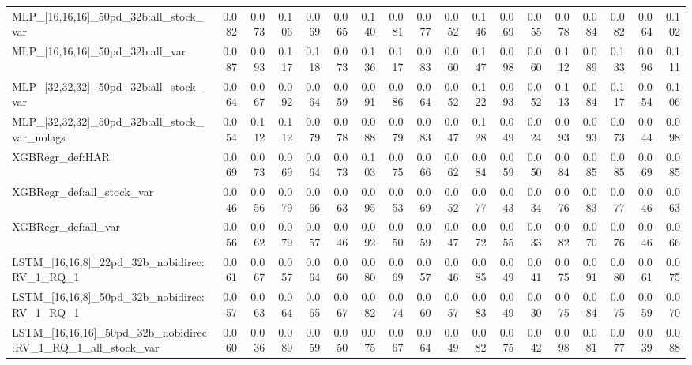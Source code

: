 \begin{tabular}{lrrrrrrrrrrrrrrrrr}
MLP\_[16,16,16]\_50pd\_32b:all\_stock\_var & 0.082 & 0.073 & 0.106 & 0.069 & 0.065 & 0.140 & 0.081 & 0.077 & 0.052 & 0.146 & 0.069 & 0.055 & 0.078 & 0.084 & 0.082 & 0.064 & 0.102 \\
MLP\_[16,16,16]\_50pd\_32b:all\_var & 0.087 & 0.093 & 0.117 & 0.118 & 0.073 & 0.136 & 0.117 & 0.083 & 0.060 & 0.147 & 0.098 & 0.060 & 0.112 & 0.089 & 0.133 & 0.096 & 0.111 \\
MLP\_[32,32,32]\_50pd\_32b:all\_stock\_var & 0.064 & 0.067 & 0.092 & 0.064 & 0.059 & 0.091 & 0.086 & 0.064 & 0.052 & 0.122 & 0.093 & 0.052 & 0.113 & 0.084 & 0.117 & 0.054 & 0.106 \\
MLP\_[32,32,32]\_50pd\_32b:all\_stock\_var\_nolags & 0.054 & 0.112 & 0.112 & 0.079 & 0.078 & 0.088 & 0.079 & 0.083 & 0.047 & 0.128 & 0.049 & 0.024 & 0.093 & 0.093 & 0.073 & 0.044 & 0.098 \\
XGBRegr\_def:HAR & 0.069 & 0.073 & 0.069 & 0.064 & 0.073 & 0.103 & 0.075 & 0.066 & 0.062 & 0.084 & 0.059 & 0.050 & 0.084 & 0.085 & 0.085 & 0.069 & 0.085 \\
XGBRegr\_def:all\_stock\_var & 0.046 & 0.056 & 0.079 & 0.066 & 0.063 & 0.095 & 0.053 & 0.069 & 0.052 & 0.077 & 0.043 & 0.034 & 0.076 & 0.083 & 0.077 & 0.046 & 0.063 \\
XGBRegr\_def:all\_var & 0.056 & 0.062 & 0.079 & 0.057 & 0.046 & 0.092 & 0.050 & 0.059 & 0.047 & 0.072 & 0.055 & 0.033 & 0.082 & 0.070 & 0.076 & 0.046 & 0.066 \\
LSTM\_[16,16,8]\_22pd\_32b\_nobidirec:RV\_1\_RQ\_1 & 0.061 & 0.067 & 0.057 & 0.064 & 0.060 & 0.080 & 0.069 & 0.057 & 0.046 & 0.085 & 0.049 & 0.041 & 0.075 & 0.091 & 0.080 & 0.061 & 0.075 \\
LSTM\_[16,16,8]\_50pd\_32b\_nobidirec:RV\_1\_RQ\_1 & 0.057 & 0.063 & 0.064 & 0.065 & 0.067 & 0.082 & 0.074 & 0.060 & 0.057 & 0.083 & 0.049 & 0.030 & 0.075 & 0.084 & 0.075 & 0.059 & 0.070 \\
LSTM\_[16,16,16]\_50pd\_32b\_nobidirec:RV\_1\_RQ\_1\_all\_stock\_var & 0.060 & 0.036 & 0.089 & 0.059 & 0.050 & 0.075 & 0.067 & 0.064 & 0.049 & 0.082 & 0.075 & 0.042 & 0.098 & 0.081 & 0.077 & 0.039 & 0.088 \\
\bottomrule
\end{tabular}
